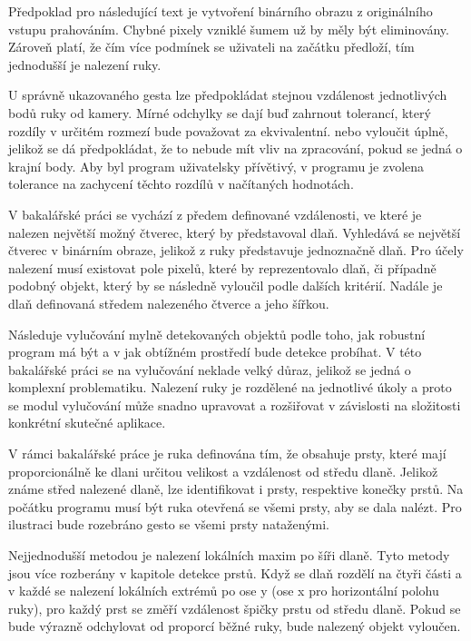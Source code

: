 Předpoklad pro následující text je vytvoření binárního obrazu z originálního vstupu prahováním. Chybné pixely vzniklé šumem už by měly být eliminovány. Zároveň platí, že čím více podmínek se uživateli na začátku předloží, tím jednodušší je nalezení ruky. %

U správně ukazovaného gesta lze předpokládat stejnou vzdálenost jednotlivých bodů ruky od kamery. Mírné odchylky se dají buď zahrnout tolerancí, který rozdíly v určitém rozmezí bude považovat za ekvivalentní. nebo vyloučit úplně, jelikož se dá předpokládat, že to nebude mít vliv na zpracování, pokud se jedná o krajní body. Aby byl program uživatelsky přívětivý, v programu je zvolena tolerance na zachycení těchto rozdílů v načítaných hodnotách.

V bakalářské práci se vychází z předem definované vzdálenosti, ve které je nalezen největší možný čtverec, který by představoval dlaň. Vyhledává se největší čtverec v binárním obraze, jelikož z ruky představuje jednoznačně dlaň. Pro účely nalezení musí existovat pole pixelů, které by reprezentovalo dlaň, či případně podobný objekt, který by se následně vyloučil podle dalších kritérií. Nadále je dlaň definovaná středem nalezeného čtverce a jeho šířkou.

Následuje vylučování mylně detekovaných objektů podle toho, jak robustní program má být a v jak obtížném prostředí bude detekce probíhat. V této bakalářské práci se na vylučování neklade velký důraz, jelikož se jedná o komplexní problematiku. Nalezení ruky je rozdělené na jednotlivé úkoly a proto se modul vylučování může snadno upravovat a rozšiřovat v závislosti na složitosti konkrétní skutečné aplikace.

V rámci bakalářské práce je ruka definována tím, že obsahuje prsty, které mají proporcionálně ke dlani určitou velikost a vzdálenost od středu dlaně. Jelikož známe střed nalezené dlaně, lze identifikovat i prsty, respektive konečky prstů. Na počátku programu musí být ruka otevřená se všemi prsty, aby se dala nalézt. Pro ilustraci bude rozebráno gesto se všemi prsty nataženými. 

Nejjednodušší metodou je nalezení lokálních maxim po šíři dlaně. Tyto metody jsou více rozberány v kapitole detekce prstů. Když se dlaň rozdělí na čtyři části a v každé se nalezení lokálních extrémů po ose y (ose x pro horizontální polohu ruky), pro každý prst se změří vzdálenost špičky prstu od středu dlaně. Pokud se bude výrazně odchylovat od proporcí běžné ruky, bude nalezený objekt vyloučen.

